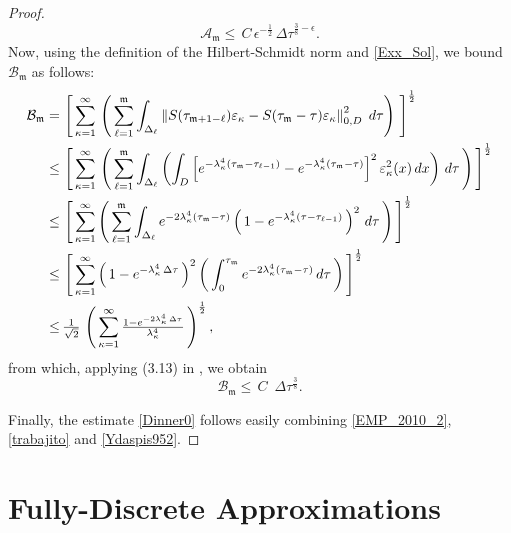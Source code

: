 \documentclass[10pt]{amsart}
\numberwithin{equation}{section}
\begin{document}
\begin{proof}
\begin{equation}\label{trabajito}
{\mathcal A}_{\mathfrak m}\leq\,C\,\epsilon^{-\frac{1}{2}}\,{\Delta\tau}^{\frac{3}{8}-\epsilon}.
\end{equation}
Now, using the definition of the Hilbert-Schmidt norm and \eqref{Exx_Sol},
we bound ${\mathcal B}_{\mathfrak m}$ as follows:
\begin{equation*}
\begin{split}
{\mathcal B}_{\mathfrak m}=&\,
\left[\,\sum_{\kappa=1}^{\infty}\,\left(\,\sum_{\ell=1}^{\mathfrak m}\int_{{\scriptscriptstyle}\Delta_{\ell}}
\left\|S(\tau_{\mathfrak m+1-\ell})\varepsilon_{\kappa}
-S(\tau_{\mathfrak m}-\tau)\varepsilon_{\kappa}\right\|_{{\scriptscriptstyle} 0,D}^2\;d\tau\right)\,\,\right]^{\frac{1}{2}}\\
\leq&\,\left[\,\sum_{\kappa=1}^{\infty}\,\left(\,
\sum_{\ell=1}^{\mathfrak m}\int_{{\scriptscriptstyle}\Delta_{\ell}} \left(\int_{{\scriptscriptstyle} D}\left[
e^{-\lambda_{\kappa}^4(\tau_{\mathfrak m}-\tau_{\ell-1})}
-e^{-\lambda_{\kappa}^4(\tau_{\mathfrak m}-\tau)}\right]^2
\varepsilon_{\kappa}^2(x)\,dx\right)
\,d\tau\,\right)\,\right]^{\frac{1}{2}}\\
\leq&\,\left[\,\sum_{\kappa=1}^{\infty}\left(\,
\sum_{\ell=1}^{\mathfrak m}\int_{{\scriptscriptstyle}\Delta_{\ell}}
e^{-2\lambda_{\kappa}^4(\tau_{\mathfrak m}-\tau)} \left(\,1-
e^{-\lambda_{\kappa}^4(\tau-\tau_{\ell-1})}\,\right)^2
\,d\tau\,\right)\,\right]^{\frac{1}{2}}\\
\leq&\,\left[\,\sum_{\kappa=1}^{\infty} \left(\,1-e^{-\lambda_{\kappa}^4\,{\Delta\tau}}\,\right)^2
\left(\, \int_0^{\tau_{\mathfrak m}} e^{-2\lambda_{\kappa}^4(\tau_{\mathfrak m}-\tau)}
\,d\tau\,\right)\,\right]^{\frac{1}{2}}\\
\leq&\,\tfrac{1}{\sqrt{2}}\,\left(\,\sum_{\kappa=1}^{\infty}
\tfrac{1-e^{-2\lambda_{\kappa}^4\,{\Delta\tau}}}{\lambda_{\kappa}^4}\,\right)^{\frac{1}{2}},
\end{split}
\end{equation*}
from which, applying (3.13) in \cite{KZ2010}, we obtain
\begin{equation}\label{Ydaspis952}
{\mathcal B}_{\mathfrak m}\leq\,C\,
\,\,\Delta\tau^{\frac{3}{8}}.
\end{equation}
\par
Finally, the estimate \eqref{Dinner0} follows easily combining \eqref{EMP_2010_2},
\eqref{trabajito} and \eqref{Ydaspis952}.
\end{proof}
\section{Fully-Discrete Approximations}\label{SECTION44}
\end{document}
